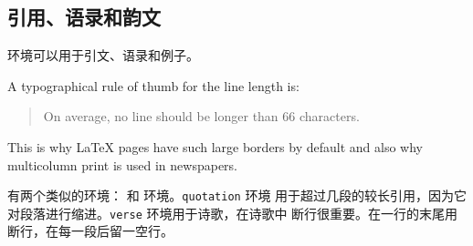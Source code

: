 \subsection{引用、语录和韵文}

 环境可以用于引文、语录和例子。
\begin{example}
A typographical rule of thumb
for the line length is:
\begin{quote}
On average, no line should
be longer than 66 characters.
\end{quote}
This is why \LaTeX{} pages have
such large borders by default
and also why multicolumn print
is used in newspapers.
\end{example}

有两个类似的环境： 和  环境。\texttt{quotation} 环境
用于超过几段的较长引用，因为它对段落进行缩进。\texttt{verse} 环境用于诗歌，在诗歌中
断行很重要。在一行的末尾用 \ci{\bs} 断行，在每一段后留一空行。


